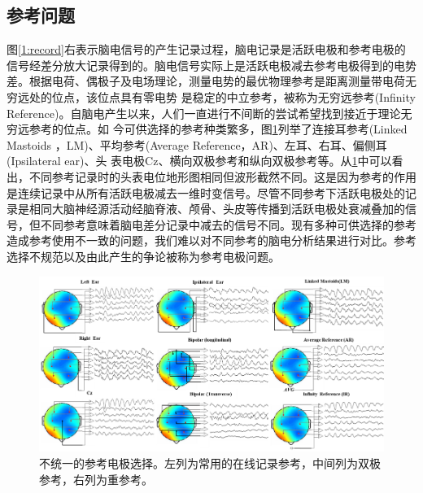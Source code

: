 \subsection{参考问题}
图\ref{1:record}右表示脑电信号的产生记录过程，脑电记录是活跃电极和参考电极的信号经差分放大记录得到的。脑电信号实际上是活跃电极减去参考电极得到的电势差。根据电荷、偶极子及电场理论，测量电势的最优物理参考是距离测量带电荷无穷远处的位点，该位点具有零电势
是稳定的中立参考，被称为无穷远参考(Infinity Reference)。自脑电产生以来，人们一直进行不间断的尝试希望找到接近于理论无穷远参考的位点。如
今可供选择的参考种类繁多，图\ref{1:ref}列举了连接耳参考(Linked Mastoids
，LM)、平均参考(Average Reference，AR)、左耳、右耳、偏侧耳(Ipsilateral ear)、头
表电极Cz、横向双极参考和纵向双极参考等。从\ref{1:ref}中可以看出，不同参考记录时的头表电位地形图相同但波形截然不同。这是因为参考的作用是连续记录中从所有活跃电极减去一维时变信号。尽管不同参考下活跃电极处的记录是相同大脑神经源活动经脑脊液、颅骨、头皮等传播到活跃电极处衰减叠加的信号，但不同参考意味着脑电差分记录中减去的信号不同。现有多种可供选择的参考造成参考使用不一致的问题，我们难以对不同参考的脑电分析结果进行对比。参考选择不规范以及由此产生的争论被称为参考电极问题。
\begin{figure}[!h]
	\includegraphics[width=15cm]{pic/xulun/EEGref.png}
	\caption{不统一的参考电极选择。左列为常用的在线记录参考，中间列为双极参考，右列为重参考。}
	\label{1:ref}
\end{figure}

